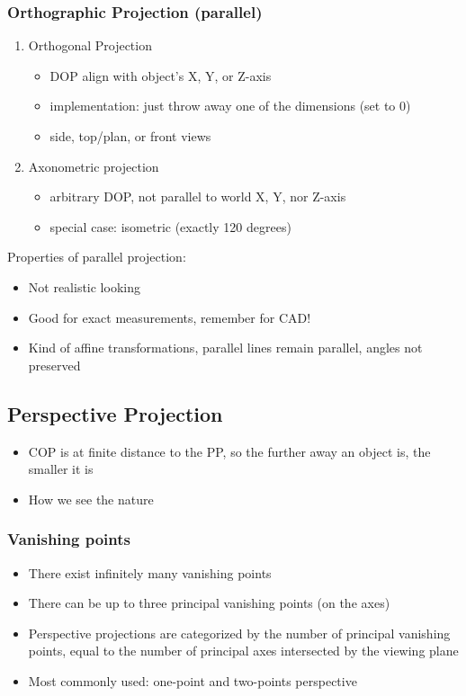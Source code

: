 \documentclass[11pt]{article}
\begin{document}
\subsubsection*{Orthographic Projection (parallel)}
\begin{enumerate}
    \item Orthogonal Projection \begin{itemize}
        \item DOP align with object's X, Y, or Z-axis
        \item implementation: just throw away one of the dimensions (set to 0)
        \item side, top/plan, or front views
    \end{itemize}
    \item Axonometric projection \begin{itemize}
        \item arbitrary DOP, not parallel to world X, Y, nor Z-axis
        \item special case: isometric (exactly 120 degrees)
    \end{itemize}
\end{enumerate}

Properties of parallel projection: 
\begin{itemize}
    \item Not realistic looking
    \item Good for exact measurements, remember for CAD!
    \item Kind of affine transformations, parallel lines remain parallel, angles not preserved
\end{itemize}

\subsection{Perspective Projection}
\begin{itemize}
    \item COP is at finite distance to the PP, so the further away an object is, the smaller it is
    \item How we see the nature
\end{itemize}

\subsubsection*{Vanishing points}
\begin{itemize}
    \item There exist infinitely many vanishing points
    \item There can be up to three principal vanishing points (on the axes)
    \item Perspective projections are categorized by the number of principal vanishing points, equal to the number of principal axes intersected by the viewing plane
    \item Most commonly used: one-point and two-points perspective
\end{itemize}
\end{document}
